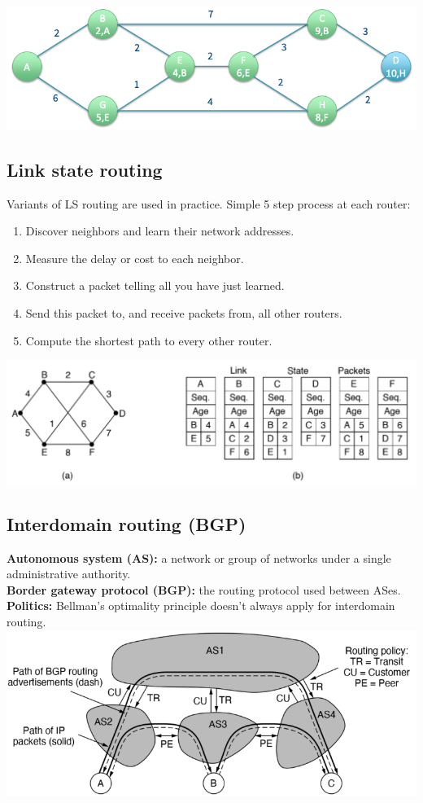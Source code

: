 \includegraphics[width=\linewidth]{figs/dijkstra-example-2.png}\\

\subsection{Link state routing}
Variants of LS routing are used in practice. Simple 5 step process at each router:
\begin{enumerate}
    \item Discover neighbors and learn their network addresses.
    \item Measure the delay or cost to each neighbor.
    \item Construct a packet telling all you have just learned.
    \item Send this packet to, and receive packets from, all other routers.
    \item Compute the shortest path to every other router.
\end{enumerate}
\includegraphics[width=\linewidth]{figs/link-state-packets.png}\\

\subsection{Interdomain routing (BGP)}
\textbf{Autonomous system (AS):} a network or group of networks under a single administrative authority.\\
\textbf{Border gateway protocol (BGP):} the routing protocol used between ASes.\\
\textbf{Politics:} Bellman's optimality principle doesn't always apply for interdomain routing.\\
\includegraphics[width=\linewidth]{figs/bgp.png}\\

